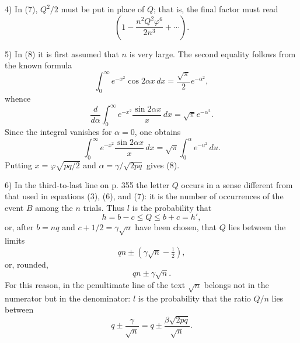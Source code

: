 \documentclass[11pt]{article}
\begin{document}
4) In (7), $Q^2/2$ must be put in place of $Q$; that is, the final factor must read
\[
 \left(1-\frac{n^2Q^2\varphi^6}{2n^3}+\cdots\right).
\]

5) In (8) it is first assumed that $n$ is very large. The second equality follows from the known formula
\[
 \int_0^\infty e^{-x^2}\cos 2\alpha x\,dx=\frac{\sqrt\pi}{2}e^{-\alpha^2},
\]
whence
\[
 \frac d{d\alpha}\int_0^\infty e^{-x^2}\frac{\sin 2\alpha x}{x}\,dx=\sqrt\pi e^{-\alpha^2}.
\]
Since the integral vanishes for $\alpha=0$, one obtains
\[
 \int_0^\infty e^{-x^2}\frac{\sin2\alpha x}{x}\,dx=\sqrt\pi\int_0^\alpha e^{-u^2}\,du.
\]
Putting $x=\varphi\sqrt{pq/2}$ and $\alpha=\gamma/\sqrt{2pq}$ gives (8).

6) In the third-to-last line on p. 355 the letter $Q$ occurs in a sense different from that used in equations (3), (6), and (7): it is the number of occurrences of the event $B$ among the $n$ trials. Thus $l$ is the probability that
\[
 h=b-c\le Q\le b+c=h',
\]
or, after $b=nq$ and $c+1/2=\gamma\sqrt n$ have been chosen, that $Q$ lies between the limits
\[
 qn\pm(\gamma\sqrt n-\tfrac12),
\]
or, rounded,
\[
 qn\pm\gamma\sqrt n.
\]
For this reason, in the penultimate line of the text $\sqrt n$ belongs not in the numerator but in the denominator: $l$ is the probability that the ratio $Q/n$ lies between
\[
 q\pm\frac{\gamma}{\sqrt n}=q\pm\frac{\beta\sqrt{2pq}}{\sqrt n}.
\]
\end{document}
